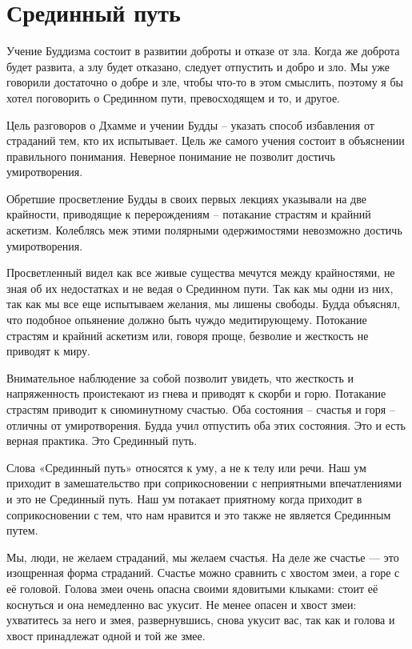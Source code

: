 \chapter{Срединный путь}

Учение Буддизма состоит в развитии доброты и отказе от зла. Когда же доброта будет развита, а злу будет отказано, следует отпустить и добро и зло. Мы уже говорили достаточно о добре и зле, чтобы что-то в этом смыслить, поэтому я бы хотел поговорить о Срединном пути, превосходящем и то, и другое.

Цель разговоров о Дхамме и учении Будды – указать способ избавления от страданий тем, кто их испытывает. Цель же самого учения состоит в объяснении правильного понимания. Неверное понимание не позволит достичь умиротворения.

Обретшие просветление Будды в своих первых лекциях указывали на две крайности, приводящие к перерождениям – потакание страстям и крайний аскетизм. Колеблясь меж этими полярными одержимостями невозможно достичь умиротворения.

Просветленный видел как все живые существа мечутся между крайностями, не зная об их недостатках и не ведая о  Срединном пути. Так как мы одни из них, так как мы все еще испытываем желания, мы лишены свободы. Будда объяснял, что подобное опьянение должно быть чуждо медитирующему. Потокание страстям и крайний аскетизм или, говоря проще, безволие и жесткость не приводят к миру.

Внимательное наблюдение за собой позволит увидеть, что жесткость и напряженность проистекают из гнева и приводят к скорби и горю. Потакание страстям приводит к сиюминутному счастью. Оба состояния – счастья и горя – отличны от умиротворения. Будда учил отпустить оба этих состояния. Это и есть верная практика. Это Срединный путь.

Слова «Срединный путь» относятся к уму, а не к телу или речи. Наш ум приходит в замешательство при соприкосновении с неприятными впечатлениями и это не Срединный путь. Наш ум потакает приятному когда приходит в соприкосновении с тем, что нам нравится и это также не является Срединным путем. 

Мы, люди, не желаем страданий, мы желаем счастья. На деле же счастье — это изощренная форма страданий. Счастье можно сравнить с хвостом змеи, а горе с её головой. Голова змеи очень опасна своими ядовитыми клыками: стоит её коснуться и она немедленно вас укусит. Не менее опасен и хвост змеи: ухватитесь за него и змея, развернувшись, снова укусит вас, так как и голова и хвост принадлежат одной и той же змее.

